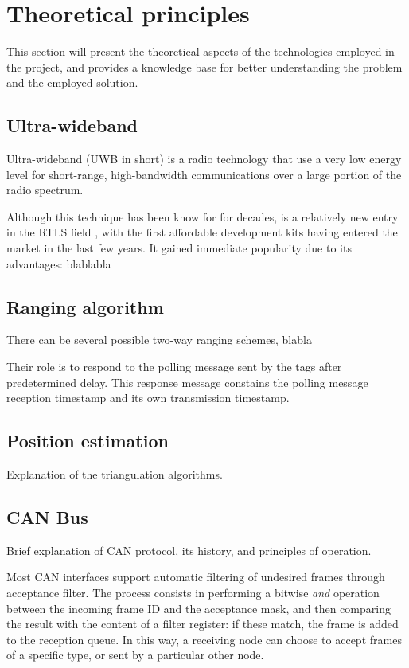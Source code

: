 \section{Theoretical principles}\label{sec:theory}
This section will present the theoretical aspects of the technologies employed in the project, and provides a knowledge base for better understanding the problem and the employed solution.


\subsection{Ultra-wideband}
Ultra-wideband (UWB in short) is a radio technology that use a very low energy level for short-range, high-bandwidth communications over a large portion of the radio spectrum.


Although this technique has been know for for decades, is a relatively new entry in the RTLS field \cite{uwb1}, with the first affordable development kits having entered the market in the last few years.
It gained immediate popularity due to its advantages: blablabla


\subsection{Ranging algorithm}
There can be several possible two-way ranging schemes, blabla

Their role is to respond to the polling message sent by the tags after predetermined delay. This response message constains the polling message reception timestamp and its own transmission timestamp.

\subsection{Position estimation}
Explanation of the triangulation algorithms.

\subsection{CAN Bus}
Brief explanation of CAN protocol, its history, and principles of operation.


Most CAN interfaces support automatic filtering of undesired frames through acceptance filter.
The process consists in performing a bitwise \emph{and} operation between the incoming frame ID and the acceptance mask, and then comparing the result with the content of a filter register: if these match, the frame is added to the reception queue.
In this way, a receiving node can choose to accept frames of a specific type, or sent by a particular other node.
